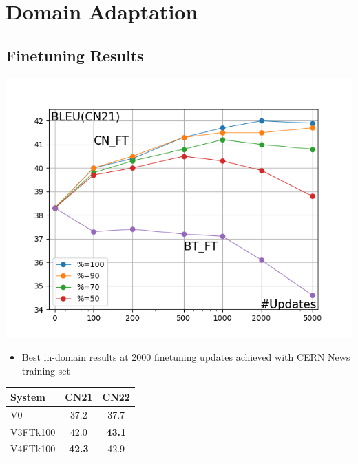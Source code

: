 \documentclass[landscape]{article}
\begin{document}
\cp
\section*{Domain Adaptation}
\subsection*{Finetuning Results}
\centering
\includegraphics[scale=0.85]{../memoria/resources/CN21_bleu.png}

\begin{itemize}
    \item Best in-domain results at 2000 finetuning updates achieved with CERN News training set 
\end{itemize}
\begin{table}[ht]
\centering
\begin{tabular}{l|c|c}
System & CN21 & CN22 \\
\hline
V0 & 37.2 & 37.7\\
V3FTk100 & 42.0 & \textbf{43.1}\\
V4FTk100 & \textbf{42.3} & 42.9\\
\end{tabular}
\label{table:bleuft}
\end{table}



\cp
\end{document}
